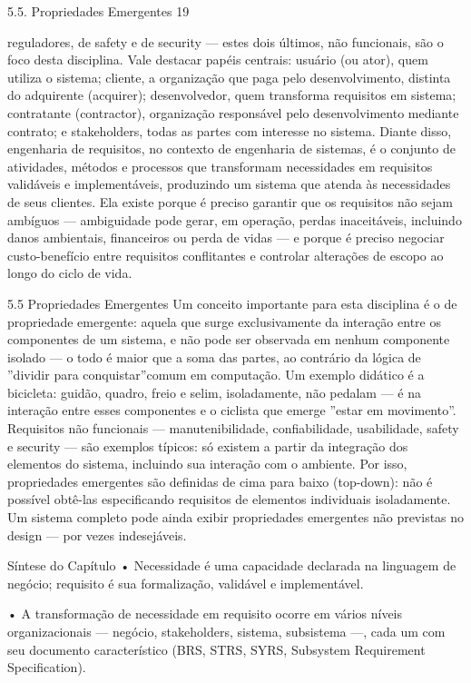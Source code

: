 5.5. Propriedades Emergentes 19

reguladores, de safety e de security — estes dois últimos, não funcionais, são o foco desta disciplina. Vale destacar papéis centrais: usuário (ou ator), quem utiliza o sistema; cliente, a organização que paga pelo desenvolvimento, distinta do adquirente (acquirer); desenvolvedor, quem transforma requisitos em sistema; contratante (contractor), organização responsável pelo desenvolvimento mediante contrato; e stakeholders, todas as partes com interesse no sistema. Diante disso, engenharia de requisitos, no contexto de engenharia de sistemas, é o conjunto de atividades, métodos e processos que transformam necessidades em requisitos validáveis e implementáveis, produzindo um sistema que atenda às necessidades de seus clientes. Ela existe porque é preciso garantir que os requisitos não sejam ambíguos — ambiguidade pode gerar, em operação, perdas inaceitáveis, incluindo danos ambientais, financeiros ou perda de vidas — e porque é preciso negociar custo-benefício entre requisitos conflitantes e controlar alterações de escopo ao longo do ciclo de vida.

5.5 Propriedades Emergentes Um conceito importante para esta disciplina é o de propriedade emergente: aquela que surge exclusivamente da interação entre os componentes de um sistema, e não pode ser observada em nenhum componente isolado — o todo é maior que a soma das partes, ao contrário da lógica de ”dividir para conquistar”comum em computação. Um exemplo didático é a bicicleta: guidão, quadro, freio e selim, isoladamente, não pedalam — é na interação entre esses componentes e o ciclista que emerge ”estar em movimento”. Requisitos não funcionais — manutenibilidade, confiabilidade, usabilidade, safety e security — são exemplos típicos: só existem a partir da integração dos elementos do sistema, incluindo sua interação com o ambiente. Por isso, propriedades emergentes são definidas de cima para baixo (top-down): não é possível obtê-las especificando requisitos de elementos individuais isoladamente. Um sistema completo pode ainda exibir propriedades emergentes não previstas no design — por vezes indesejáveis.

Síntese do Capítulo • Necessidade é uma capacidade declarada na linguagem de negócio; requisito é sua formalização, validável e implementável.

• A transformação de necessidade em requisito ocorre em vários níveis organizacionais — negócio, stakeholders, sistema, subsistema —, cada um com seu documento característico (BRS, STRS, SYRS, Subsystem Requirement Specification).

